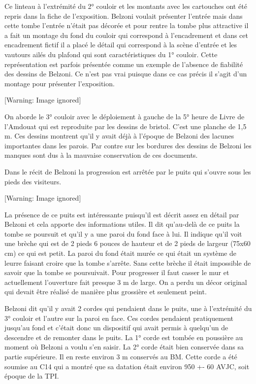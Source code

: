 \documentclass{article}
\begin{document}
Ce linteau à l’extrémité du 2° couloir et les montants avec les
cartouches ont été repris dans la fiche de l’exposition. Belzoni
voulait présenter l’entrée mais dans cette tombe l’entrée n’était pas
décorée et pour rentre la tombe plus attractive il a fait un montage du
fond du couloir qui correspond à l’encadrement et dans cet encadrement
fictif il a placé le détail qui correspond à la scène d’entrée et les
vautours ailés du plafond qui sont caractéristiques du 1° couloir. 
Cette représentation est parfois présentée comme un exemple de
l’absence de fiabilité des dessins de Belzoni. Ce n’est pas vrai
puisque dans ce cas précis il s’agit d’un montage pour présenter
l’exposition.

  [Warning: Image ignored] %
 

On aborde le 3° couloir avec le déploiement à gauche de la 5° heure de
Livre de l’Amdouat qui est reproduite par les dessins de bristol. C’est
une planche de 1,5 m. Ces dessins montrent qu’il y avait déjà à
l’époque de Belzoni des lacunes importantes dans les parois. Par contre
sur les bordures des dessins de Belzoni les manques sont dus à la
mauvaise conservation de ces documents.

Dans le récit de Belzoni la progression est arrêtée par le puits qui
s’ouvre sous les pieds des visiteurs. 

  [Warning: Image ignored] %
 

La présence de ce puits est intéressante puisqu’il est décrit assez en
détail par Belzoni et cela apporte des informations utiles. Il dit
qu’au-delà de ce puits la tombe se poursuit et qu’il y a une paroi du
fond face à lui. Il indique qu’il voit une brèche qui est de 2 pieds 6
pouces de hauteur et de 2 pieds de largeur (75x60 cm) ce qui est petit.
La paroi du fond était murée ce qui était un système de leurre faisant
croire que la tombe s’arrête. Sans cette brèche il était impossible de
savoir que la tombe se poursuivait. Pour progresser il faut casser le
mur et actuellement l’ouverture fait presque 3 m de large. On a perdu
un décor original qui devait être réalisé de manière plus grossière et
seulement peint.

Belzoni dit qu’il y avait 2 cordes qui pendaient dans le puits, une à
l’extrémité du 3° couloir et l’autre sur la paroi en face. Ces cordes
pendaient pratiquement jusqu’au fond et c’était donc un dispositif qui
avait permis à quelqu’un de descendre et de remonter dans le puits. La
1° corde est tombée en poussière au moment où Belzoni a voulu s’en
saisir. La 2° corde était bien conservée dans sa partie supérieure. Il
en reste environ 3 m conservés au BM. Cette corde a été soumise au C14
qui a montré que sa datation était environ 950 +- 60 AVJC, soit époque
de la TPI.
\end{document}
